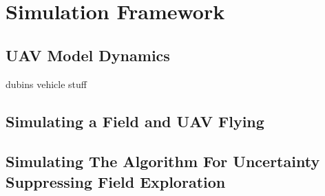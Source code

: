 \chapter{Simulation Framework}
\section{UAV Model Dynamics}
dubins vehicle stuff
\section{Simulating a Field and UAV Flying}
\section{Simulating The Algorithm For Uncertainty Suppressing Field Exploration}